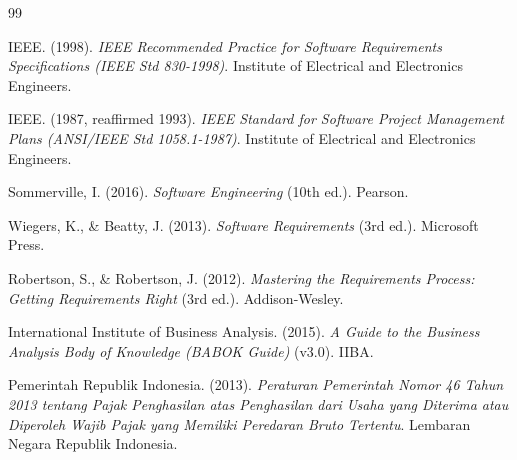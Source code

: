 \documentclass[11pt,a4paper]{article}
\begin{document}
\begin{thebibliography}{99}

	IEEE. (1998).
	\textit{IEEE Recommended Practice for Software Requirements Specifications (IEEE Std 830-1998)}.
	Institute of Electrical and Electronics Engineers.

	IEEE. (1987, reaffirmed 1993).
	\textit{IEEE Standard for Software Project Management Plans (ANSI/IEEE Std 1058.1-1987)}.
	Institute of Electrical and Electronics Engineers.

	Sommerville, I. (2016).
	\textit{Software Engineering} (10th ed.).
	Pearson.

	Wiegers, K., \& Beatty, J. (2013).
	\textit{Software Requirements} (3rd ed.).
	Microsoft Press.

	Robertson, S., \& Robertson, J. (2012).
	\textit{Mastering the Requirements Process: Getting Requirements Right} (3rd ed.).
	Addison-Wesley.

	International Institute of Business Analysis. (2015).
	\textit{A Guide to the Business Analysis Body of Knowledge (BABOK Guide)} (v3.0).
	IIBA.

	Pemerintah Republik Indonesia. (2013).
	\textit{Peraturan Pemerintah Nomor 46 Tahun 2013 tentang Pajak Penghasilan atas Penghasilan dari Usaha yang Diterima atau Diperoleh Wajib Pajak yang Memiliki Peredaran Bruto Tertentu}.
	Lembaran Negara Republik Indonesia.

\end{thebibliography}
\end{document}
